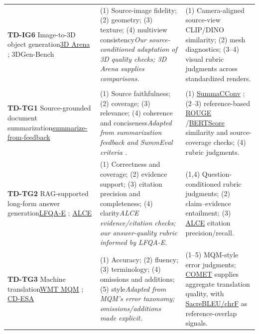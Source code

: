 \begin{longtable}{@{}P{3.45cm}P{3.55cm}P{5.68cm}@{}}
\addlinespace
\textbf{TD-IG6} Image-to-3D object generation\newline \href{https://huggingface.co/datasets/3d-arena/3d-arena}{3D Arena} \citep{ebert20253darena}; 3DGen-Bench & (1) Source-image fidelity; (2) geometry; (3) texture; (4) multiview consistency\newline\emph{Our source-conditioned adaptation of 3D quality checks; 3D Arena supplies comparisons.} & (1) Camera-aligned source-view CLIP/DINO similarity; (2) mesh diagnostics; (3--4) visual rubric judgments across standardized renders.\\
\addlinespace
{}\\*
\textbf{TD-TG1} Source-grounded document summarization\newline \href{https://huggingface.co/datasets/openai/summarize_from_feedback}{summarize-from-feedback} \citep{stiennon2020summarize} & (1) Source faithfulness; (2) coverage; (3) relevance; (4) coherence and conciseness\newline\emph{Adapted from summarization feedback and SummEval criteria \citep{fabbri2021summeval}.} & (1) \href{https://github.com/tingofurro/summac}{SummaCConv} \citep{laban2022summac}; (2--3) reference-based \href{https://github.com/google-research/google-research/tree/master/rouge}{ROUGE} \citep{lin2004rouge}/\href{https://github.com/Tiiiger/bert_score}{BERTScore} \citep{zhang2020bertscore} similarity and source-coverage checks; (4) rubric judgments.\\
\addlinespace
\textbf{TD-TG2} RAG-supported long-form answer generation\newline \href{https://github.com/YuchenFan48/LFQA-E}{LFQA-E} \citep{fan2026lfqae}; \href{https://github.com/princeton-nlp/ALCE}{ALCE} \citep{gao2023alce} & (1) Correctness and coverage; (2) evidence support; (3) citation precision and completeness; (4) clarity\newline\emph{ALCE evidence/citation checks; our answer-quality rubric informed by LFQA-E.} & (1,4) Question-conditioned rubric judgments; (2) claim--evidence entailment; (3) \href{https://github.com/princeton-nlp/ALCE}{ALCE} citation precision/recall.\\
\addlinespace
\textbf{TD-TG3} Machine translation\newline \href{https://github.com/google/wmt-mqm-human-evaluation}{WMT MQM} \citep{freitag2021mqm}; \href{https://huggingface.co/datasets/FinnSchmidt/CD-ESA}{CD-ESA} \citep{schmidt2026cdesa} & (1) Accuracy; (2) fluency; (3) terminology; (4) omissions and additions; (5) style\newline\emph{Adapted from MQM's error taxonomy; omissions/additions made explicit.} & (1--5) MQM-style error judgments; \href{https://github.com/Unbabel/COMET}{COMET} \citep{rei2020comet} supplies aggregate translation quality, with \href{https://github.com/mjpost/sacrebleu}{SacreBLEU/chrF} \citep{post2018sacrebleu,popovic2015chrf} as reference-overlap signals.\\

\end{longtable}
